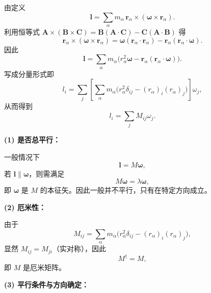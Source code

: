 \begin{solution}[转动惯量矩阵与角动量的本征结构]
\answer

由定义
\[
\mathbf l=\sum_\alpha m_\alpha\,\mathbf r_\alpha\times(\boldsymbol\omega\times \mathbf r_\alpha).
\]
利用恒等式 $\mathbf A\times(\mathbf B\times\mathbf C)=\mathbf B(\mathbf A\cdot\mathbf C)-\mathbf C(\mathbf A\cdot\mathbf B)$ 得
\[
\mathbf r_\alpha\times(\boldsymbol\omega\times \mathbf r_\alpha)
=\boldsymbol\omega(\mathbf r_\alpha\cdot \mathbf r_\alpha)-\mathbf r_\alpha(\mathbf r_\alpha\cdot \boldsymbol\omega).
\]
因此
\[
\mathbf l=\sum_\alpha m_\alpha\big(r_\alpha^2\boldsymbol\omega-\mathbf r_\alpha(\mathbf r_\alpha\cdot \boldsymbol\omega)\big).
\]
写成分量形式即
\[
l_i=\sum_j\left[\sum_\alpha m_\alpha\big(r_\alpha^2\delta_{ij}-(r_\alpha)_i(r_\alpha)_j\big)\right]\omega_j,
\]
从而得到
\[
l_i=\sum_j M_{ij}\omega_j.
\]

\vspace{0.3em}
\textbf{(1) 是否总平行：}

一般情况下
\[
\mathbf l=M\boldsymbol\omega,
\]
若 $\mathbf l\parallel \boldsymbol\omega$，则需满足
\[
M\boldsymbol\omega=\lambda \boldsymbol\omega,
\]
即 $\boldsymbol\omega$ 是 $M$ 的本征矢。因此一般并不平行，只有在特定方向成立。

\vspace{0.3em}
\textbf{(2) 厄米性：}

由于
\[
M_{ij}=\sum_\alpha m_\alpha\big(r_\alpha^2\delta_{ij}-(r_\alpha)_i(r_\alpha)_j\big),
\]
显然 $M_{ij}=M_{ji}$（实对称），因此
\[
M^\dagger=M,
\]
即 $M$ 是厄米矩阵。

\vspace{0.3em}
\textbf{(3) 平行条件与方向确定：}


\end{solution}
